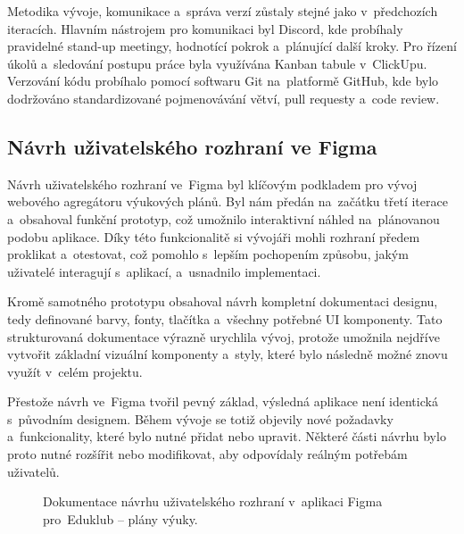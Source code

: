 \documentclass[male,czech,api_bc]{kitheses}
\begin{document}
Metodika vývoje, komunikace a~správa verzí zůstaly stejné jako v~předchozích iteracích. Hlavním nástrojem pro komunikaci byl Discord, kde probíhaly pravidelné stand-up meetingy, hodnotící pokrok a~plánující další kroky. Pro řízení úkolů a~sledování postupu práce byla využívána Kanban tabule v~ClickUpu. Verzování kódu probíhalo pomocí softwaru Git na~platformě GitHub, kde bylo dodržováno standardizované pojmenovávání větví, pull requesty a~code review.

\subsection{Návrh uživatelského rozhraní ve Figma}

Návrh uživatelského rozhraní ve~Figma byl klíčovým podkladem pro vývoj webového agregátoru výukových plánů. Byl nám předán na~začátku třetí iterace a~obsahoval funkční prototyp, což umožnilo interaktivní náhled na~plánovanou podobu aplikace. Díky této funkcionalitě si vývojáři mohli rozhraní předem proklikat a~otestovat, což pomohlo s~lepším pochopením způsobu, jakým uživatelé interagují s~aplikací, a~usnadnilo implementaci.

Kromě samotného prototypu obsahoval návrh kompletní dokumentaci designu, tedy definované barvy, fonty, tlačítka a~všechny potřebné UI komponenty. Tato strukturovaná dokumentace výrazně urychlila vývoj, protože umožnila nejdříve vytvořit základní vizuální komponenty a~styly, které bylo následně možné znovu využít v~celém projektu.

Přestože návrh ve~Figma tvořil pevný základ, výsledná aplikace není identická s~původním designem. Během vývoje se totiž objevily nové požadavky a~funkcionality, které bylo nutné přidat nebo upravit. Některé části návrhu bylo proto nutné rozšířit nebo modifikovat, aby odpovídaly reálným potřebám uživatelů.

\begin{figure}[H]
	\centering
	\caption{Dokumentace návrhu uživatelského rozhraní v~aplikaci Figma pro~Eduklub – plány výuky.}
	\label{fig:eduklub-navrh-1}
\end{figure}
\end{document}
